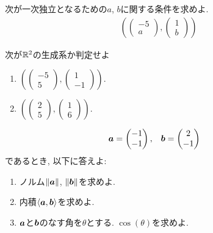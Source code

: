 \begin{quiz}
次が一次独立となるための$a$, $b$に関する条件を求めよ.
  \begin{align*}
    (\begin{pmatrix}-5\\a\end{pmatrix},
    \begin{pmatrix}1\\b\end{pmatrix})
  \end{align*}
\end{quiz}

\begin{quiz}
  \label{quiz:5:2}
  次が$\mathbb{R}^2$の生成系か判定せよ
  \begin{enumerate}
  \item $(\begin{pmatrix}-5\\5\end{pmatrix},\begin{pmatrix}1\\-1\end{pmatrix})$.
  \item $(\begin{pmatrix}2\\5\end{pmatrix},\begin{pmatrix}1\\6\end{pmatrix})$.
  \end{enumerate}
\end{quiz}



\begin{quiz}
  \label{quiz:5:5}
  \begin{align*}
    \boldsymbol{a}&=\begin{pmatrix}-1\\-1\end{pmatrix},&
    \boldsymbol{b}&=\begin{pmatrix}2\\-1\end{pmatrix}
  \end{align*}
  であるとき,
  以下に答えよ:
  \begin{enumerate}
  \item ノルム$\|\boldsymbol{a}\|$, $\|\boldsymbol{b}\|$を求めよ.
  \item 内積$\Braket{\boldsymbol{a},\boldsymbol{b}}$を求めよ.
  \item $\boldsymbol{a}$と$\boldsymbol{b}$のなす角を$\theta$とする. $\cos(\theta)$を求めよ.
  \end{enumerate}
\end{quiz}

